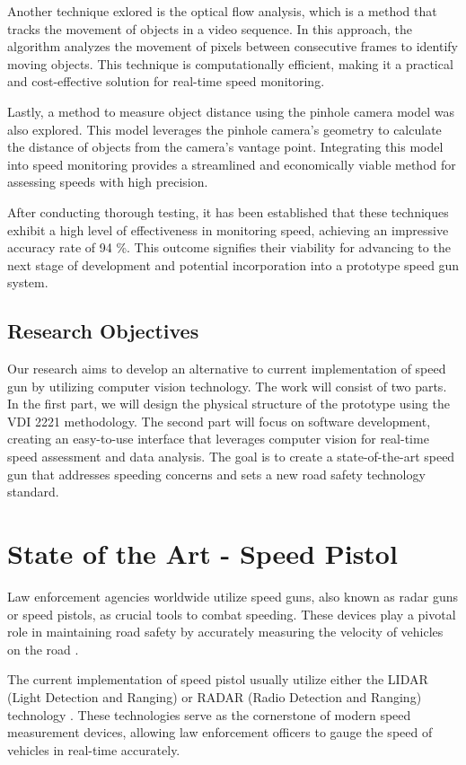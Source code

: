 Another technique exlored is the optical flow analysis, which is a method that tracks the movement of objects in a video sequence. In this approach, the algorithm analyzes the movement of pixels between consecutive frames to identify moving objects. This technique is computationally efficient, making it a practical and cost-effective solution for real-time speed monitoring.

Lastly, a method to measure object distance using the pinhole camera model was also explored. This model leverages the pinhole camera's geometry to calculate the distance of objects from the camera's vantage point. Integrating this model into speed monitoring provides a streamlined and economically viable method for assessing speeds with high precision.

After conducting thorough testing, it has been established that these techniques exhibit a high level of effectiveness in monitoring speed, achieving an impressive accuracy rate of 94 \%. This outcome signifies their viability for advancing to the next stage of development and potential incorporation into a prototype speed gun system.

\section{Research Objectives}
Our research aims to develop an alternative to current implementation of speed gun by utilizing computer vision technology. The work will consist of two parts. In the first part, we will design the physical structure of the prototype using the VDI 2221 methodology. The second part will focus on software development, creating an easy-to-use interface that leverages computer vision for real-time speed assessment and data analysis. The goal is to create a state-of-the-art speed gun that addresses speeding concerns and sets a new road safety technology standard.

\chapter{State of the Art - Speed Pistol}
\label{chap:stateoftheart}
Law enforcement agencies worldwide utilize speed guns, also known as radar guns or speed pistols, as crucial tools to combat speeding. These devices play a pivotal role in maintaining road safety by accurately measuring the velocity of vehicles on the road \cite{Hull_2020}.

The current implementation of speed pistol usually utilize either the LIDAR (Light Detection and Ranging) or RADAR (Radio Detection and Ranging) technology \cite{StalkerRadar_2023} \cite{FlyGuys_2023} \cite{Kustom23} \cite{LaserTech_2023}. These technologies serve as the cornerstone of modern speed measurement devices, allowing law enforcement officers to gauge the speed of vehicles in real-time accurately.

